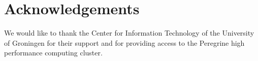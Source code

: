\section{Acknowledgements}

We would like to thank the Center for Information Technology of the University of Groningen for their support
and for providing access to the Peregrine high performance computing cluster.
